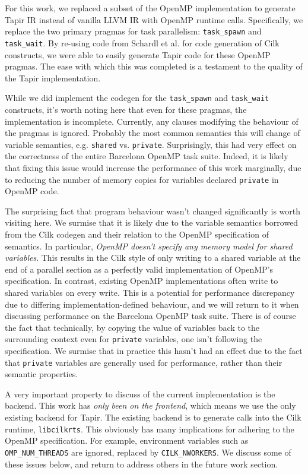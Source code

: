 \documentclass[sigconf]{acmart}
\begin{document}
For this work, we replaced a subset of the OpenMP implementation to generate
Tapir IR instead of vanilla LLVM IR with OpenMP runtime calls. Specifically, we
replace the two primary pragmas for task parallelism: \texttt{task\_spawn} and
\texttt{task\_wait}. By re-using code from Schardl et al. for code generation
of Cilk constructs, we were able to easily generate Tapir code for these OpenMP
pragmas. The ease with which this was completed is a testament to the quality of
the Tapir implementation. 

While we did implement the codegen for the \texttt{task\_spawn} and
\texttt{task\_wait} constructs, it's worth noting here that even for these
pragmas, the implementation is incomplete. Currently, any clauses modifying the 
behaviour of the pragmas is ignored. Probably the most common semantics this
will change of variable semantics, e.g. \texttt{shared} vs. \texttt{private}.
Surprisingly, this had very effect on the correctness of the entire Barcelona
OpenMP task suite. Indeed, it is likely that fixing this issue would increase
the performance of this work marginally, due to reducing the number of memory
copies for variables declared \texttt{private} in OpenMP code. 

The surprising fact that program behaviour wasn't changed significantly is
worth visiting here. We surmise that it is likely due to the variable semantics
borrowed from the Cilk codegen and their relation to the OpenMP specification
of semantics.  In particular, \emph{OpenMP doesn't specify any memory model for
shared variables}. This results in the Cilk style of only writing to a shared
variable at the end of a parallel section as a perfectly valid implementation
of OpenMP's specification. In contrast, existing OpenMP implementations often
write to shared variables on every write. This is a potential for performance
discrepancy due to differing implementation-defined behaviour, and we will 
return to it when discussing performance on the Barcelona OpenMP task suite.
There is of course the fact that technically, by copying the value of variables
back to the surrounding context even for \texttt{private} variables, one isn't
following the specification. We surmise that in practice this hasn't had an
effect due to the fact that \texttt{private} variables are generally used for
performance, rather than their semantic properties. 

A very important property to discuss of the current implementation is the
backend. This work has \emph{only been on the frontend}, which means we use
the only existing backend for Tapir. The existing backend is to generate 
calls into the Cilk runtime, \texttt{libcilkrts}. This obviously has many 
implications for adhering to the OpenMP specification. For example, environment
variables such as \texttt{OMP\_NUM\_THREADS} are ignored, replaced by
\texttt{CILK\_NWORKERS}. We discuss some of these issues below, and return to 
address others in the future work section. 
\end{document}
